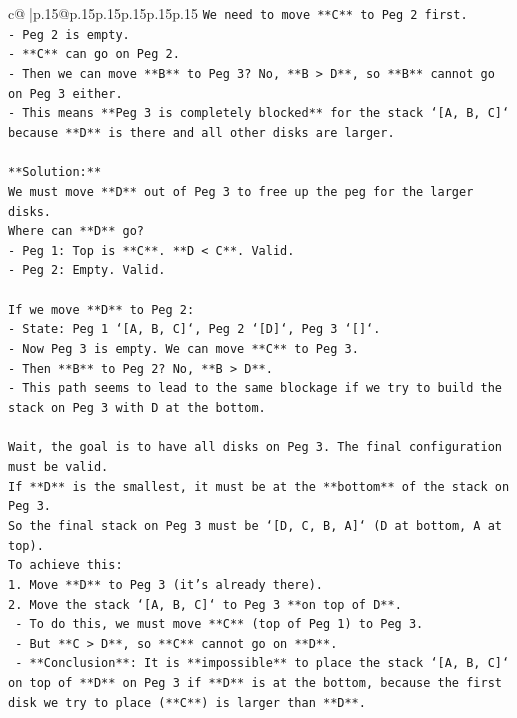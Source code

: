 \documentclass{article}
\begin{document}
{\begin{supertabular}{c@{$\;$}|p{.15\linewidth}@{}p{.15\linewidth}p{.15\linewidth}p{.15\linewidth}p{.15\linewidth}p{.15\linewidth}}
{{{\texttt{We need to move **C** to Peg 2 first.} \\
\texttt{{-} Peg 2 is empty.} \\
\texttt{{-} **C** can go on Peg 2.} \\
\texttt{{-} Then we can move **B** to Peg 3? No, **B > D**, so **B** cannot go on Peg 3 either.} \\
\texttt{{-} This means **Peg 3 is completely blocked** for the stack `{[}A, B, C{]}` because **D** is there and all other disks are larger.} \\
\\ 
\texttt{**Solution:**} \\
\texttt{We must move **D** out of Peg 3 to free up the peg for the larger disks.} \\
\texttt{Where can **D** go?} \\
\texttt{{-} Peg 1: Top is **C**. **D < C**. Valid.} \\
\texttt{{-} Peg 2: Empty. Valid.} \\
\\ 
\texttt{If we move **D** to Peg 2:} \\
\texttt{{-} State: Peg 1 `{[}A, B, C{]}`, Peg 2 `{[}D{]}`, Peg 3 `{[}{]}`.} \\
\texttt{{-} Now Peg 3 is empty. We can move **C** to Peg 3.} \\
\texttt{{-} Then **B** to Peg 2? No, **B > D**.} \\
\texttt{{-} This path seems to lead to the same blockage if we try to build the stack on Peg 3 with D at the bottom.} \\
\\ 
\texttt{Wait, the goal is to have all disks on Peg 3. The final configuration must be valid.} \\
\texttt{If **D** is the smallest, it must be at the **bottom** of the stack on Peg 3.} \\
\texttt{So the final stack on Peg 3 must be `{[}D, C, B, A{]}` (D at bottom, A at top).} \\
\texttt{To achieve this:} \\
\texttt{1. Move **D** to Peg 3 (it's already there).} \\
\texttt{2. Move the stack `{[}A, B, C{]}` to Peg 3 **on top of D**.} \\
\texttt{   {-} To do this, we must move **C** (top of Peg 1) to Peg 3.} \\
\texttt{   {-} But **C > D**, so **C** cannot go on **D**.} \\
\texttt{   {-} **Conclusion**: It is **impossible** to place the stack `{[}A, B, C{]}` on top of **D** on Peg 3 if **D** is at the bottom, because the first disk we try to place (**C**) is larger than **D**.} \\
}}}
\end{supertabular}}
\end{document}
